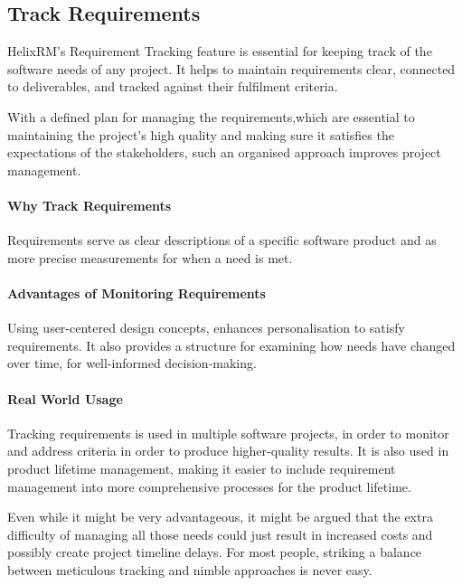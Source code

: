 \subsection{Track Requirements}

HelixRM's Requirement Tracking feature is essential for keeping
track of the software needs of any project.
It helps to maintain requirements clear, connected to
deliverables, and tracked against their fulfilment criteria.

With a defined plan for managing the requirements,which
are essential to maintaining the project's high quality and
making sure it satisfies the expectations of the stakeholders,
such an organised approach improves project management.

\paragraph{Why Track Requirements}
Requirements serve as clear descriptions of a specific software product\cite{j_e__archer_2003}
and as more precise measurements for when a need is met\cite{evangelos_markopoulos__2009}.


\paragraph{Advantages of Monitoring Requirements}
Using user-centered design concepts, enhances personalisation to satisfy requirements\cite{maria_grazia_violante__2017}.
It also provides a structure for examining how needs have changed over time, for well-informed decision-making\cite{evangelos_markopoulos__2009}.

\paragraph{Real World Usage}
Tracking requirements is used in multiple software projects, in order to monitor and address criteria in order to produce higher-quality results\cite{edward_r__rang__1985}.
It is also used in product lifetime management, making it easier to include requirement management into more comprehensive processes for the product lifetime\cite{maria_grazia_violante__2017}.

Even while it might be very advantageous, it might be
argued that the extra difficulty of managing all those needs
could just result in increased costs and possibly create project
timeline delays.
For most people, striking a balance between meticulous
tracking and nimble approaches is never easy.

